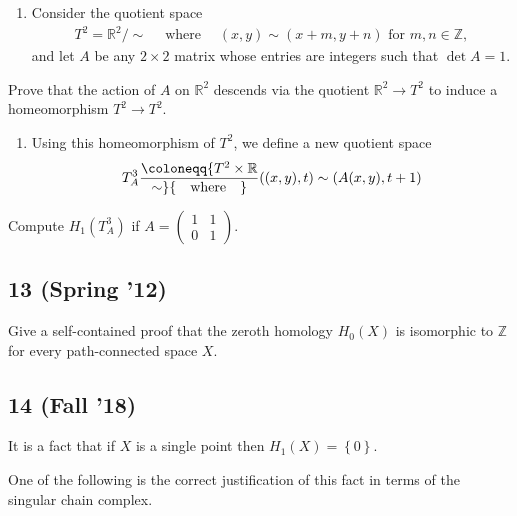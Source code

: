 \begin{enumerate}
\def\labelenumi{\alph{enumi}.}
\tightlist
\item
  Consider the quotient space
  \begin{align*}
  T^2 = {\mathbb{R}}^2 / \sim {\quad \operatorname{where} \quad} (x, y) \sim (x + m, y + n) \text{ for } m, n \in {\mathbb{Z}}
  ,\end{align*}
  and let \(A\) be any \(2 \times 2\) matrix whose entries are integers
  such that \(\operatorname{det}A = 1\).
\end{enumerate}

Prove that the action of \(A\) on \({\mathbb{R}}^2\) descends via the
quotient \({\mathbb{R}}^2 \to T^2\) to induce a homeomorphism
\(T^2 \to T^2\).

\begin{enumerate}
\def\labelenumi{\alph{enumi}.}
\setcounter{enumi}{1}
\tightlist
\item
  Using this homeomorphism of \(T^2\), we define a new quotient space
  \begin{align*}
  T_A^3 \coloneqq{T^2\times{\mathbb{R}}\over \sim} {\quad \operatorname{where} \quad} ((x, y), t) \sim (A(x, y), t + 1)
  \end{align*}
\end{enumerate}

Compute \(H_1 (T_A^3 )\) if
\(A=\left(\begin{array}{ll} 1 & 1 \\ 0 & 1 \end{array}\right).\)

\hypertarget{spring-12-2}{%
\subsection{13 (Spring '12)}\label{spring-12-2}}

Give a self-contained proof that the zeroth homology \(H_0 (X)\) is
isomorphic to \({\mathbb{Z}}\) for every path-connected space \(X\).

\hypertarget{fall-18-5}{%
\subsection{14 (Fall '18)}\label{fall-18-5}}

It is a fact that if \(X\) is a single point then
\(H_1 (X) = \left\{{0}\right\}\).

One of the following is the correct justification of this fact in terms
of the singular chain complex.

